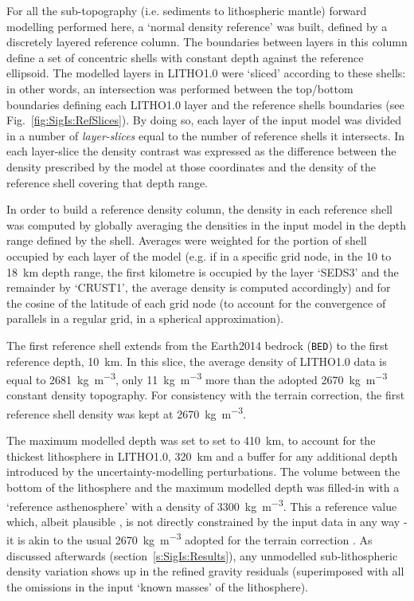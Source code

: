 For all the sub-topography (i.e. sediments to lithospheric mantle) forward modelling performed here, a `normal density reference' was built, defined by a discretely layered reference column.
The boundaries between layers in this column define a set of concentric shells with constant depth against the reference ellipsoid.
The modelled layers in {LITHO1.0} were `sliced' according to these shells: in other words, an intersection was performed between the top/bottom boundaries defining each {LITHO1.0} layer and the reference shells boundaries (see Fig.~\ref{fig:SigIs:RefSlices}).
By doing so, each layer of the input model was divided in a number of \textit{layer-slices} equal to the number of reference shells it intersects.
In each layer-slice the density contrast was expressed as the difference between the density prescribed by the model at those coordinates and the density of the reference shell covering that depth range.

In order to build a reference density column, the density in each reference shell was computed by globally averaging the densities in the input model in the depth range defined by the shell.
Averages were weighted for the portion of shell occupied by each layer of the model (e.g. if in a specific grid node, in the \num{10} to \SI{18}{km} depth range, the first kilometre is occupied by the layer `SEDS3' and the remainder by `CRUST1', the average density is computed accordingly) and for the cosine of the latitude of each grid node (to account for the convergence of parallels in a regular grid, in a spherical approximation).

The first reference shell extends from the {Earth2014} bedrock (\texttt{BED}) to the first reference depth, \SI{10}{\kilo \metre}.
In this slice, the average density of {LITHO1.0} data is equal to \SI{2681}{\kilo \gram \per \cubic \metre}, only \SI{11}{\kilo \gram \per \cubic \metre} more than the adopted \SI{2670}{\kilo \gram \per \cubic \metre} constant density topography.
For consistency with the terrain correction, the first reference shell density was kept at \SI{2670}{\kilo \gram \per \cubic \metre}.

The maximum modelled depth was set to set to \SI{410}{\kilo \metre}, to account for the thickest lithosphere in {LITHO1.0}, \SI{320}{\kilo \metre} and a buffer for any additional depth introduced by the uncertainty-modelling perturbations.
The volume between the bottom of the lithosphere and the maximum modelled depth was filled-in with a `reference asthenosphere' with a density of \SI{3300}{\kilo \gram \per \cubic \metre}.
This a reference value which, albeit plausible \parencite[e.g.][]{Bormann2002}, is not directly constrained by the input data in any way - it is akin to the usual \SI{2670}{\kilo \gram \per \cubic \metre} adopted for the terrain correction \parencite{Hinze2003}.
As discussed afterwards (section~\ref{s:SigIs:Results}), any unmodelled sub-lithospheric density variation shows up in the refined gravity residuals (superimposed with all the omissions in the input `known masses' of the lithosphere).

